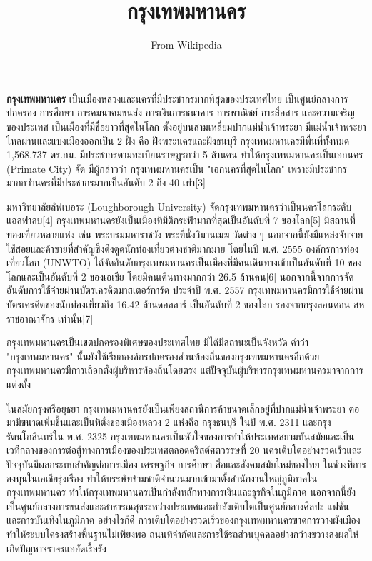 \documentclass[twocolumn]{article}
\begin{document}
\title{กรุงเทพมหานคร}
\author{From Wikipedia}

\maketitle

\textbf{กรุงเทพมหานคร} เป็นเมืองหลวงและนครที่มีประชากรมากที่สุดของประเทศไทย เป็นศูนย์กลางการปกครอง การศึกษา การคมนาคมขนส่ง การเงินการธนาคาร การพาณิชย์ การสื่อสาร และความเจริญของประเทศ เป็นเมืองที่มีชื่อยาวที่สุดในโลก ตั้งอยู่บนสามเหลี่ยมปากแม่น้ำเจ้าพระยา มีแม่น้ำเจ้าพระยาไหลผ่านและแบ่งเมืองออกเป็น 2 ฝั่ง คือ ฝั่งพระนครและฝั่งธนบุรี กรุงเทพมหานครมีพื้นที่ทั้งหมด 1,568.737 ตร.กม. มีประชากรตามทะเบียนราษฎรกว่า 5 ล้านคน ทำให้กรุงเทพมหานครเป็นเอกนคร (Primate City) จัด มีผู้กล่าวว่า กรุงเทพมหานครเป็น "เอกนครที่สุดในโลก" เพราะมีประชากรมากกว่านครที่มีประชากรมากเป็นอันดับ 2 ถึง 40 เท่า[3]

มหาวิทยาลัยลัฟเบอระ (Loughborough University) จัดกรุงเทพมหานครว่าเป็นนครโลกระดับแอลฟาลบ[4] กรุงเทพมหานครยังเป็นเมืองที่มีตึกระฟ้ามากที่สุดเป็นอันดับที่ 7 ของโลก[5] มีสถานที่ท่องเที่ยวหลายแห่ง เช่น พระบรมมหาราชวัง พระที่นั่งวิมานเมฆ วัดต่าง ๆ นอกจากนี้ยังมีแหล่งจับจ่ายใช้สอยและค้าขายที่สำคัญซึ่งดึงดูดนักท่องเที่ยวต่างชาติมากมาย โดยในปี พ.ศ. 2555 องค์กรการท่องเที่ยวโลก (UNWTO) ได้จัดอันดับกรุงเทพมหานครเป็นเมืองที่มีคนเดินทางเข้าเป็นอันดับที่ 10 ของโลกและเป็นอันดับที่ 2 ของเอเชีย โดยมีคนเดินทางมากกว่า 26.5 ล้านคน[6] นอกจากนี้จากการจัดอันดับการใช้จ่ายผ่านบัตรเครดิตมาสเตอร์การ์ด ประจำปี พ.ศ. 2557 กรุงเทพมหานครมีการใช้จ่ายผ่านบัตรเครดิตของนักท่องเที่ยวถึง 16.42 ล้านดอลลาร์ เป็นอันดับที่ 2 ของโลก รองจากกรุงลอนดอน สหราชอาณาจักร เท่านั้น[7]

กรุงเทพมหานครเป็นเขตปกครองพิเศษของประเทศไทย มิได้มีสถานะเป็นจังหวัด คำว่า "กรุงเทพมหานคร" นั้นยังใช้เรียกองค์กรปกครองส่วนท้องถิ่นของกรุงเทพมหานครอีกด้วย กรุงเทพมหานครมีการเลือกตั้งผู้บริหารท้องถิ่นโดยตรง แต่ปัจจุบันผู้บริหารกรุงเทพมหานครมาจากการแต่งตั้ง

ในสมัยกรุงศรีอยุธยา กรุงเทพมหานครยังเป็นเพียงสถานีการค้าขนาดเล็กอยู่ที่ปากแม่น้ำเจ้าพระยา ต่อมามีขนาดเพิ่มขึ้นและเป็นที่ตั้งของเมืองหลวง 2 แห่งคือ กรุงธนบุรี ในปี พ.ศ. 2311 และกรุงรัตนโกสินทร์ใน พ.ศ. 2325 กรุงเทพมหานครเป็นหัวใจของการทำให้ประเทศสยามทันสมัยและเป็นเวทีกลางของการต่อสู้ทางการเมืองของประเทศตลอดคริสต์ศตวรรษที่ 20 นครเติบโตอย่างรวดเร็วและปัจจุบันมีผลกระทบสำคัญต่อการเมือง เศรษฐกิจ การศึกษา สื่อและสังคมสมัยใหม่ของไทย ในช่วงที่การลงทุนในเอเชียรุ่งเรือง ทำให้บรรษัทข้ามชาติจำนวนมากเข้ามาตั้งสำนักงานใหญ่ภูมิภาคในกรุงเทพมหานคร ทำให้กรุงเทพมหานครเป็นกำลังหลักทางการเงินและธุรกิจในภูมิภาค นอกจากนี้ยังเป็นศูนย์กลางการขนส่งและสาธารณสุขระหว่างประเทศและกำลังเติบโตเป็นศูนย์กลางศิลปะ แฟชัน และการบันเทิงในภูมิภาค อย่างไรก็ดี การเติบโตอย่างรวดเร็วของกรุงเทพมหานครขาดการวางผังเมือง ทำให้ระบบโครงสร้างพื้นฐานไม่เพียงพอ ถนนที่จำกัดและการใช้รถส่วนบุคคลอย่างกว้างขวางส่งผลให้เกิดปัญหาจราจรแออัดเรื้อรัง
\end{document}
